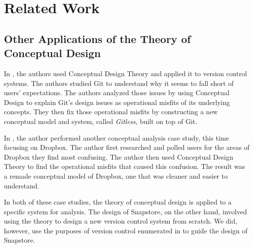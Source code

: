 \chapter{Related Work}

\section{Other Applications of the Theory of Conceptual Design}



In \cite{RossoJackson}, the authors used Conceptual Design Theory and applied it to version control systems. The authors studied Git to understand why it seems to fall short of users' expectations. The authors analyzed those issues by using Conceptual Design to explain Git's design issues as operational misfits of its underlying concepts. They then fix those operational misfits by constructing a new conceptual model and system, called \textit{Gitless}, built on top of Git.

In \cite{Zhang}, the author performed another conceptual analysis case study, this time focusing on Dropbox. The author first researched and polled users for the areas of Dropbox they find most confusing. The author then used Conceptual Design Theory to find the operational misfits that caused this confusion. The result was a remade conceptual model of Dropbox, one that was cleaner and easier to understand.

In both of these case studies, the theory of conceptual design is applied to a specific system for analysis. The design of Snapstore, on the other hand, involved using the theory to design a new version control system from scratch. We did, however, use the purposes of version control enumerated in \cite{SantiagoJackson} to guide the design of Snapstore.


